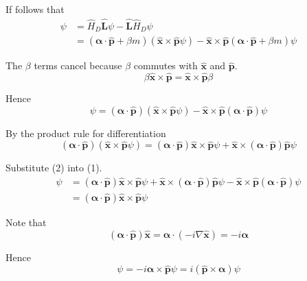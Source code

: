 If follows that
\begin{align*}
[\hat H_D,\hat{\mathbf L}]\psi
&=\hat H_D\hat{\mathbf L}\psi-\hat{\mathbf L}\hat H_D\psi
\\
&=(\boldsymbol\alpha\cdot\hat{\mathbf p}+\beta m)(\hat{\mathbf x}\times\hat{\mathbf p}\psi)
-\hat{\mathbf x}\times\hat{\mathbf p}(\boldsymbol\alpha\cdot\hat{\mathbf p}+\beta m)\psi
\end{align*}

The $\beta$ terms cancel because $\beta$ commutes with $\hat{\mathbf x}$ and $\hat{\mathbf p}$.
\begin{equation*}
\beta\hat{\mathbf x}\times\hat{\mathbf p}
=\hat{\mathbf x}\times\hat{\mathbf p}\beta
\end{equation*}

Hence
\begin{equation*}
[\hat H_D,\hat{\mathbf L}]\psi
=(\boldsymbol\alpha\cdot\hat{\mathbf p})(\hat{\mathbf x}\times\hat{\mathbf p}\psi)
-\hat{\mathbf x}\times\hat{\mathbf p}(\boldsymbol\alpha\cdot\hat{\mathbf p})\psi
\tag{1}
\end{equation*}

By the product rule for differentiation
\begin{equation*}
(\boldsymbol\alpha\cdot\hat{\mathbf p})(\hat{\mathbf x}\times\hat{\mathbf p}\psi)
=(\boldsymbol\alpha\cdot\hat{\mathbf p})\hat{\mathbf x}\times\hat{\mathbf p}\psi
+\hat{\mathbf x}\times(\boldsymbol\alpha\cdot\hat{\mathbf p})\hat{\mathbf p}\psi
\tag{2}
\end{equation*}

Substitute (2) into (1).
\begin{align*}
[\hat H_D,\hat{\mathbf L}]\psi
&=(\boldsymbol\alpha\cdot\hat{\mathbf p})\hat{\mathbf x}\times\hat{\mathbf p}\psi
+\hat{\mathbf x}\times(\boldsymbol\alpha\cdot\hat{\mathbf p})\hat{\mathbf p}\psi
-\hat{\mathbf x}\times\hat{\mathbf p}(\boldsymbol\alpha\cdot\hat{\mathbf p})\psi
\\
&=(\boldsymbol\alpha\cdot\hat{\mathbf p})\hat{\mathbf x}\times\hat{\mathbf p}\psi
\end{align*}

Note that
\begin{equation*}
(\boldsymbol\alpha\cdot\hat{\mathbf p})\hat{\mathbf x}
=\boldsymbol\alpha\cdot(-i\nabla\hat{\mathbf x})
=-i\boldsymbol\alpha
\end{equation*}

Hence
\begin{equation*}
[\hat H_D,\hat{\mathbf L}]\psi
=-i\boldsymbol\alpha\times\hat{\mathbf p}\psi
=i(\hat{\mathbf p}\times\boldsymbol\alpha)\psi
\end{equation*}

